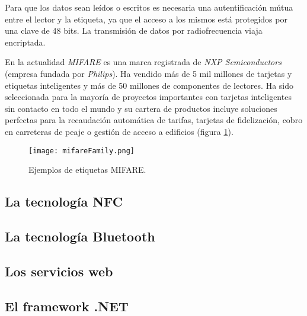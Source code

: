   Para que los datos sean leídos o escritos es necesaria una autentificación 
  mútua entre el lector y la etiqueta, ya que el acceso a los mismos está 
  protegidos por una clave de 48 bits. La transmisión de datos por
  radiofrecuencia viaja encriptada.

  En la actualidad \emph{MIFARE} es una marca registrada de \emph{NXP
  Semiconductors} (empresa fundada por \emph{Philips}). Ha vendido más de 5 mil
  millones de tarjetas y etiquetas inteligentes y más de 50 millones de
  componentes de lectores. Ha sido seleccionada para la mayoría
  de proyectos importantes con tarjetas inteligentes sin contacto en todo el
  mundo y su cartera de productos incluye soluciones perfectas para la
  recaudación automática de tarifas, tarjetas de fidelización, cobro en 
  carreteras de peaje o gestión de acceso a edificios\cite{bib:urlMifare} 
  (figura \ref{fig:mifareFamily}).

  \begin{figure}[!h]
    \begin{center}
      \texttt{[image: mifareFamily.png]}
      \caption{Ejemplos de etiquetas MIFARE.}
      \label{fig:mifareFamily}
    \end{center}
  \end{figure}

  \subsection{La tecnología NFC}

  \subsection{La tecnología Bluetooth}

  \subsection{Los servicios web}

  \subsection{El framework .NET}

